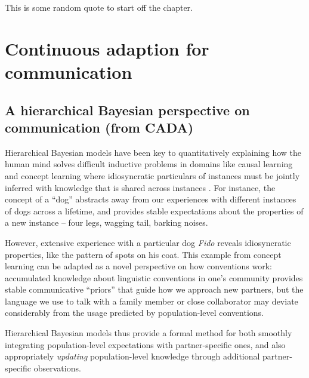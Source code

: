 \begin{savequote}[75mm]
This is some random quote to start off the chapter.
\end{savequote}

\chapter{Continuous adaption for communication}
\graphicspath{{./figures/modeling/}}

\section{A hierarchical Bayesian perspective on communication (from CADA)}

Hierarchical Bayesian models have been key to quantitatively explaining how the human mind solves difficult inductive problems in domains like causal learning and concept learning where idiosyncratic particulars of instances must be jointly inferred with knowledge that is shared across instances .
For instance, the concept of a ``dog'' abstracts away from our experiences with different instances of dogs across a lifetime, and provides stable expectations about the properties of a new instance -- four legs, wagging tail, barking noises.

However, extensive experience with a particular dog \emph{Fido} reveals idiosyncratic properties, like the pattern of spots on his coat.
This example from concept learning can be adapted as a novel perspective on how conventions work: accumulated knowledge about linguistic conventions in one's community provides stable communicative ``priors'' that guide how we approach new partners, but the language we use to talk with a family member or close collaborator may deviate considerably from the usage predicted by population-level conventions.

Hierarchical Bayesian models thus provide a formal method for both smoothly integrating population-level expectations with partner-specific ones, and also appropriately \emph{updating} population-level knowledge through additional partner-specific observations. 

